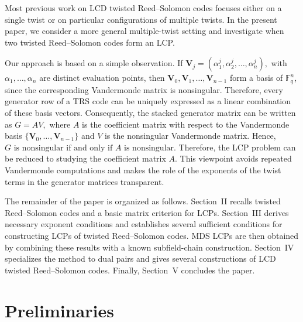 \documentclass[12pt,draftcls,journal,onecolumn]{IEEEtran}
\begin{document}
Most previous work on LCD twisted Reed--Solomon codes focuses either on a single twist or on particular configurations of multiple twists. In the present paper, we consider a more general multiple-twist setting and investigate when two twisted Reed--Solomon codes form an LCP.

Our approach is based on a simple observation. If
\(
\mathbf{V}_j=(\alpha_1^j,\alpha_2^j,\ldots,\alpha_n^j),
\)
with \(\alpha_1,\ldots,\alpha_n\) are distinct evaluation points, then
\(
\mathbf{V}_0,\mathbf{V}_1,\ldots,\mathbf{V}_{n-1}
\)
form a basis of \(\mathbb F_q^n\), since the corresponding Vandermonde
matrix is nonsingular. Therefore, every generator row of a TRS code can
be uniquely expressed as a linear combination of these basis vectors.
Consequently, the stacked generator matrix can be written as
\(
G=AV,
\)
where \(A\) is the coefficient matrix with respect to the Vandermonde
basis \( \{\mathbf V_0,\ldots,\mathbf V_{n-1}\}\) and \(V\) is the
nonsingular Vandermonde matrix. Hence,
\(
G\text{ is nonsingular if and only if }A\text{ is nonsingular}.
\)
Therefore, the LCP problem can be reduced to studying the coefficient
matrix \(A\). This viewpoint avoids repeated Vandermonde computations
and makes the role of the exponents of the twist terms in the generator
matrices transparent.

The remainder of the paper is organized as follows. Section~II recalls twisted Reed--Solomon codes and a basic matrix
criterion for LCPs. Section~III derives necessary exponent conditions and establishes several sufficient conditions for constructing LCPs of twisted Reed--Solomon codes. MDS LCPs are then obtained by combining these results with a known subfield-chain construction. Section~IV specializes the method to dual pairs and gives several constructions of LCD twisted Reed--Solomon codes. Finally, Section~V concludes the paper.












\section{Preliminaries}\label{sec-preliminaries}
\end{document}
